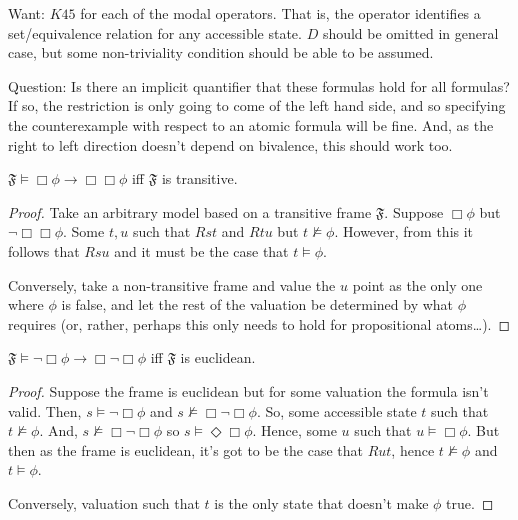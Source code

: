 \documentclass[10pt]{article}
\newcommand{\oframe}[1]{\ensuremath{\mathfrak{#1}}}
\begin{document}
Want: \(K45\) for each of the modal operators.
That is, the operator identifies a set/equivalence relation for any accessible state.
\(D\) should be omitted in general case, but some non-triviality condition should be able to be assumed.

{\color{red} Question: Is there an implicit quantifier that these formulas hold for all formulas?
  If so, the restriction is only going to come of the left hand side, and so specifying the counterexample with respect to an atomic formula will be fine.
And, as the right to left direction doesn't depend on bivalence, this should work too.}

\begin{proposition}[Transitivity]
  \(\oframe{F} \vDash \Box\phi \rightarrow \Box\Box\phi\) iff \(\oframe{F}\) is transitive.
  \begin{proof}
    Take an arbitrary model based on a transitive frame \(\oframe{F}\).
    Suppose \(\Box\phi\) but \(\lnot\Box\Box\phi\).
    Some \(t,u\) such that \(Rst\) and \(Rtu\) but \(t \nvDash \phi\).
    However, from this it follows that \(Rsu\) and it must be the case that \(t \vDash \phi\).

    Conversely, take a non-transitive frame and value the \(u\) point as the only one where \(\phi\) is false, and let the rest of the valuation be determined by what \(\phi\) requires (or, rather, perhaps this only needs to hold for propositional atoms\dots).
  \end{proof}
\end{proposition}

\begin{proposition}
  \(\oframe{F} \vDash \lnot\Box\phi \rightarrow \Box\lnot\Box\phi\) iff \(\oframe{F}\) is euclidean.
  \begin{proof}
    Suppose the frame is euclidean but for some valuation the formula isn't valid.
    Then, \(s \vDash \lnot\Box\phi\) and \(s \nvDash \Box\lnot\Box\phi\).
    So, some accessible state \(t\) such that \(t \nvDash \phi\).
    And, \(s \nvDash \Box\lnot\Box\phi\) so \(s \vDash \Diamond\Box\phi\).
    Hence, some \(u\) such that \(u \vDash \Box\phi\).
    But then as the frame is euclidean, it's got to be the case that \(Rut\), hence \(t \nvDash \phi\) and \(t \vDash \phi\).

    Conversely, valuation such that \(t\) is the only state that doesn't make \(\phi\) true.
  \end{proof}
\end{proposition}
\end{document}
